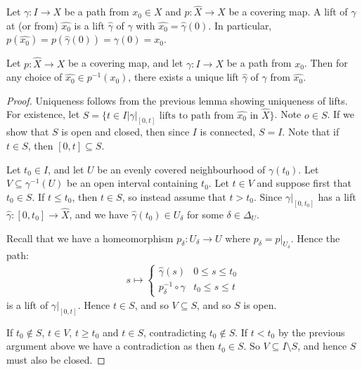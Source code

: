 \documentclass[10pt,a4paper]{article}
\begin{document}
Let $\gamma:I\rightarrow X$ be a path from $x_0\in X$ and $p:\hat{X}\rightarrow X$ be a covering map. A lift of $\gamma$ at (or from) $\hat{x_0}$ is a lift $\hat{\gamma}$ of $\gamma$ with $\hat{x_0} = \hat{\gamma}(0)$. In particular, $p(\hat{x_0}) = p(\hat{\gamma}(0)) = \gamma(0) = x_0$.

\begin{lemma}
Let $p:\hat{X} \to X$ be a covering map, and let $\gamma:I\to X$ be a path from $x_0$. Then for any choice of $\hat{x_0}\in p^{-1}(x_0)$, there exists a unique lift $\hat{\gamma}$ of $\gamma$ from $\hat{x_0}$.
\end{lemma}
\begin{proof}
Uniqueness follows from the previous lemma showing uniqueness of lifts. For existence, let $S = \{t\in I |\gamma|_{[0,t]} \text{ lifts to path from $\hat{x_0}$ in $\hat{X}$}\}$. Note $o \in S$. If we show that $S$ is open and closed, then since $I$ is connected, $S=I$. Note that if $t \in S$, then $[0,t]\subseteq S$. 

Let $t_0 \in I$, and let $U$ be an evenly covered neighbourhood of $\gamma(t_0)$. Let $V\subseteq \gamma^{-1}(U)$ be an open interval containing $t_0$. Let $t\in V$ and suppose first that $t_0 \in S$. If $t\leq t_0$, then $t\in S$, so instead assume that $t > t_0$. Since $\gamma|_{[0,t_0]}$ has a lift $\hat{\gamma}:[0, t_0]\to \hat{X}$, and we have $\hat{\gamma}(t_0) \in U_{\delta}$ for some $\delta \in \Delta_U$.

Recall that we have a homeomorphism $p_{\delta} : U_{\delta} \to U$ where $p_{\delta} = p|_{U_\delta}$. Hence the path:
\begin{align*}
s \mapsto \begin{cases} \hat{\gamma}(s) & 0 \leq s \leq t_0 \\ p_{\delta}^{-1}\circ \gamma & t_0 \leq s \leq t \end{cases}
\end{align*}
is a lift of $\gamma|_{[0,t]}$. Hence $t\in S$, and so $V \subseteq S$, and so $S$ is open.

If $t_0 \notin S$, $t \in V$, $t\geq t_0$ and $t \in S$, contradicting $t_0 \notin S$. If $t <t_0$ by the previous argument above we have a contradiction as then $t_0 \in S$. So $V\subseteq I\setminus S$, and hence $S$ must also be closed.
\end{proof}
\end{document}
